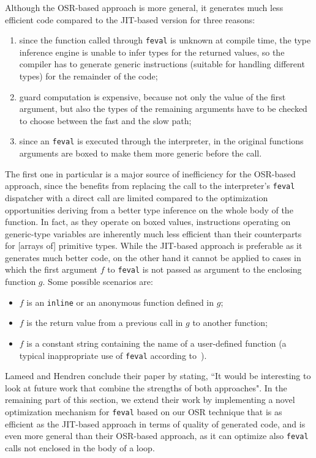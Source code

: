 Although the OSR-based approach is more general, it generates much less efficient code compared to the JIT-based version for three reasons:
\begin{enumerate}
\item since the function called through {\tt feval} is unknown at compile time, the type inference engine is unable to infer types for the returned values, so the compiler has to generate generic instructions (suitable for handling different types) for the remainder of the code;
\item guard computation is expensive, because not only the value of the first argument, but also the types of the remaining arguments have to be checked to choose between the fast and the slow path;
\item since an {\tt feval} is executed through the interpreter, in the original functions arguments are boxed to make them more generic before the call.
\end{enumerate}

The first one in particular is a major source of inefficiency for the OSR-based approach, since the benefits from replacing the call to the interpreter's {\tt feval} dispatcher with a direct call are limited compared to the optimization opportunities deriving from a better type inference on the whole body of the function. In fact, as they operate on boxed values, instructions operating on generic-type variables are inherently much less efficient than their counterparts for [arrays of] primitive types. While the JIT-based approach is preferable as it generates much better code, on the other hand it cannot be applied to cases in which the first argument $f$ to {\tt feval} is not passed as argument to the enclosing function $g$. Some possible scenarios are:
\begin{itemize}
\item $f$ is an {\tt inline} or an anonymous function defined in $g$;
\item $f$ is the return value from a previous call in $g$ to another function;
\item $f$ is a constant string containing the name of a user-defined function (a typical inappropriate use of {\tt feval} according to~\cite{radpour2013refactoring}).
\end{itemize}
 
Lameed and Hendren conclude their paper by stating, ``It would be interesting to look at future work that combine the
strengths of both approaches". In the remaining part of this section, we extend their work by implementing a novel optimization mechanism for {\tt feval} based on our OSR technique that is as efficient as the JIT-based approach in terms of quality of generated code, and is even more general than their OSR-based approach, as it can optimize also {\tt feval} calls not enclosed in the body of a loop.


